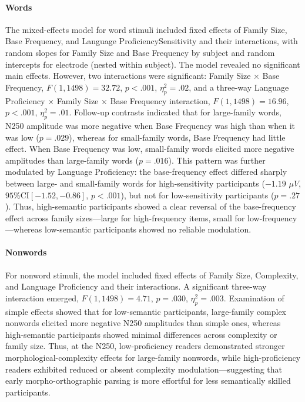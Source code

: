 \paragraph{Words}

The mixed-effects model for word stimuli included fixed effects of Family Size, Base Frequency, and Language ProficiencySensitivity and their interactions, with random slopes for Family Size and Base Frequency by subject and random intercepts for electrode (nested within subject). The model revealed no significant main effects. However, two interactions were significant: Family Size × Base Frequency, $F(1, 1498) = 32.72$, $p < .001$, $\eta_p^2 = .02$, and a three-way Language Proficiency × Family Size × Base Frequency interaction, $F(1, 1498) = 16.96$, $p < .001$, $\eta_p^2 = .01$. Follow-up contrasts indicated that for large-family words, N250 amplitude was more negative when Base Frequency was high than when it was low ($p = .029$), whereas for small-family words, Base Frequency had little effect. When Base Frequency was low, small-family words elicited more negative amplitudes than large-family words ($p = .016$). This pattern was further modulated by Language Proficiency: the base-frequency effect differed sharply between large- and small-family words for high-sensitivity participants ($-1.19$ $\mu V$, $95\% \text{CI} [-1.52, -0.86]$, $p < .001$), but not for low-sensitivity participants ($p = .27$). Thus, high-semantic participants showed a clear reversal of the base-frequency effect across family sizes—large for high-frequency items, small for low-frequency—whereas low-semantic participants showed no reliable modulation.

\paragraph{Nonwords}

For nonword stimuli, the model included fixed effects of Family Size, Complexity, and Language Proficiency and their interactions. A significant three-way interaction emerged, $F(1, 1498) = 4.71$, $p = .030$, $\eta_p^2 = .003$. Examination of simple effects showed that for low-semantic participants, large-family complex nonwords elicited more negative N250 amplitudes than simple ones, whereas high-semantic participants showed minimal differences across complexity or family size. Thus, at the N250, low-proficiency readers demonstrated stronger morphological-complexity effects for large-family nonwords, while high-proficiency readers exhibited reduced or absent complexity modulation—suggesting that early morpho-orthographic parsing is more effortful for less semantically skilled participants.

